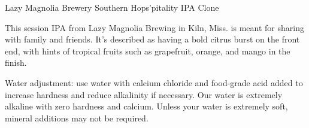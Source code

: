 \begin{recipie}{Lazy Magnolia Brewery Southern Hops'pitality IPA Clone}

\begin{aboutblock}
This session IPA from Lazy Magnolia Brewing in Kiln, Miss. is meant for sharing
with family and friends. It's described as having a bold citrus burst on the front
end, with hints of tropical fruits such as grapefruit, orange, and mango in the
finish. \sourceaha
\end{aboutblock}


\begin{methodandtiming}
 
\begin{mashsteps}
\end{mashsteps}

\begin{fermentationsteps}
\end{fermentationsteps}

\begin{directions}
Water adjustment: use water with calcium chloride and food-grade acid added to
increase hardness and reduce alkalinity if necessary. Our water is extremely
alkaline with zero hardness and calcium. Unless your water is extremely soft,
mineral additions may not be required.
\end{directions}

\end{methodandtiming}

\pagebreak

\begin{ingredientsblock}

\begin{malts}
\end{malts}

\begin{hops}
\end{hops}


\end{ingredientsblock}

\end{recipie}

